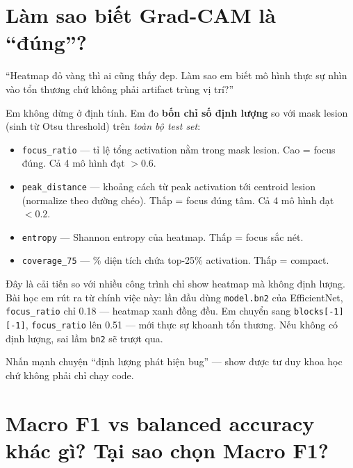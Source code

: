 \documentclass[11pt,a4paper]{article}
\begin{document}
\section{Làm sao biết Grad-CAM là ``đúng''?}

\begin{question}
``Heatmap đỏ vàng thì ai cũng thấy đẹp. Làm sao em biết mô hình thực sự nhìn vào tổn thương chứ không phải artifact trùng vị trí?''
\end{question}

\begin{answer}
Em không dừng ở định tính. Em đo \textbf{bốn chỉ số định lượng} so với mask lesion (sinh từ Otsu threshold) trên \textit{toàn bộ test set}:

\begin{itemize}[leftmargin=*]
  \item \texttt{focus\_ratio} — tỉ lệ tổng activation nằm trong mask lesion. Cao = focus đúng. Cả 4 mô hình đạt $> 0.6$.
  \item \texttt{peak\_distance} — khoảng cách từ peak activation tới centroid lesion (normalize theo đường chéo). Thấp = focus đúng tâm. Cả 4 mô hình đạt $< 0.2$.
  \item \texttt{entropy} — Shannon entropy của heatmap. Thấp = focus sắc nét.
  \item \texttt{coverage\_75} — \% diện tích chứa top-25\% activation. Thấp = compact.
\end{itemize}

Đây là cải tiến so với nhiều công trình chỉ show heatmap mà không định lượng. Bài học em rút ra từ chính việc này: lần đầu dùng \texttt{model.bn2} của EfficientNet, \texttt{focus\_ratio} chỉ 0.18 --- heatmap xanh đồng đều. Em chuyển sang \texttt{blocks[-1][-1]}, \texttt{focus\_ratio} lên 0.51 --- mới thực sự khoanh tổn thương. Nếu không có định lượng, sai lầm \texttt{bn2} sẽ trượt qua.
\end{answer}

\begin{tip}
Nhấn mạnh chuyện ``định lượng phát hiện bug'' --- show được tư duy khoa học chứ không phải chỉ chạy code.
\end{tip}

\section{Macro F1 vs balanced accuracy khác gì? Tại sao chọn Macro F1?}
\end{document}
